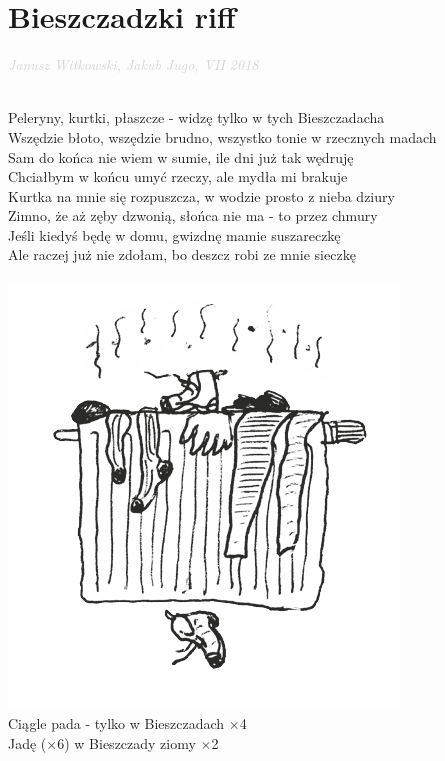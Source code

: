 \documentclass[a5paper, 10pt]{book}
\begin{document}
\newpage
\section{Bieszczadzki riff}\textcolor{lightgray}{\textit{Janusz Witkowski, Jakub Jugo, VII 2018 }}\\~\\
\begin{minipage}[t]{1\textwidth}
  Peleryny, kurtki, płaszcze - widzę tylko w tych Bieszczadach\hfill a\\
  Wszędzie błoto, wszędzie brudno, wszystko tonie w rzecznych madach\\
  Sam do końca nie wiem w sumie, ile dni już tak wędruję\\
  Chciałbym w końcu umyć rzeczy, ale mydła mi brakuje\\
  \hspace*{3mm}Kurtka na mnie się rozpuszcza, w wodzie prosto z nieba dziury\\
  \hspace*{3mm}Zimno, że aż zęby dzwonią, słońca nie ma - to przez chmury\\
  \hspace*{3mm}Jeśli kiedyś będę w domu, gwizdnę mamie suszareczkę\\
  \hspace*{3mm}Ale raczej już nie zdołam, bo deszcz robi ze mnie sieczkę\\
  \\
  \includegraphics[height=0.3\textwidth, right]{images/bieszczadzki_riff_1.png}\vspace*{-0.3\textwidth}\\
  \hspace*{10mm}Ciągle pada - tylko w Bieszczadach $\times$4\\
  \hspace*{10mm}Jadę ($\times$6) w Bieszczady ziomy $\times$2\\


\end{minipage}
\end{document}

